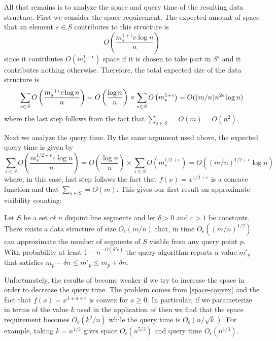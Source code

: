 \documentclass{patmorin}
\newcommand{\Oe}{O_\epsilon}
\begin{document}
All that remains is to analyze the space and query time of the resulting
data structure.  First we consider the space requirement.  The expected
amount of space that an element $s\in S$ contributes to this structure is
\[
    O\left(\frac{m_s^{1+\epsilon}c\log n}{n}\right)
\]
since it contributes $O(m_s^{1+\epsilon})$ space if it is chosen to take
part in $S'$ and it contributes nothing otherwise.  Therefore, the total
expected size of the data structure is
\begin{equation}
    \sum_{s\in S}O\left(\frac{m_s^{1+\epsilon}c\log n}{n}\right)
     = O\left(\frac{\log n}{n}\right)
         \times\sum_{s\in S}O\left(m_s^{1+\epsilon}\right)
     = O((m/n)n^{2\epsilon}\log n) \eqlabel{space-convex}
\end{equation}
where the last step follows from the fact that $\sum_{s\in S} = O(m) = O(n^2)$.

Next we analyze the query time. By the same argument used above, the
expected query time is given by 
\[
    \sum_{s\in S}O\left(\frac{m_s^{1/2+\epsilon}c\log n}{n}\right)
     = O\left(\frac{\log n}{n}\right)
         \times\sum_{s\in S}O\left(m_s^{1/2+\epsilon}\right)
     = O((m/n)^{1/2+\epsilon}\log n)
\]
where, in this case, last step follows the fact that
$f(x)=x^{1/2+\epsilon}$ is a concave function and that $\sum_{s\in S}
= O(m)$.  This gives our first result on approximate visibility counting:

\begin{thm}
Let $S$ be a set of $n$ disjoint line segments and let $\delta > 0$ and $c>
1$ be constants.  There exists a
data structure of size $\Oe(m/n)$ that, in time $\Oe((m/n)^{1/2})$
can approximate the number of segments of $S$ visible from any query
point $p$.  With probability at least $1-n^{-\Omega(\delta^2 c)}$ the
query algorithm reports a value $m'_p$ that satisfies $m_p-\delta n \le
m'_p \le m_p+\delta n$.
\end{thm}

Unfortunately, the results of  become weaker if we try
to increase the space in order to decrease the query time.  The problem
comes from \eqref{space-convex} and the fact that $f(x)=x^{1+a+\epsilon}$
is convex for $a\ge 0$.  In particular, if we parameterize in terms of
the value $k$ used in the application of  then we
find that the space requirement becomes $\Oe(k^2/n)$ while the query
time is $\Oe(n/\sqrt{k})$.  For example, taking $k=n^{4/3}$ gives space
$\Oe(n^{5/3})$ and query time $\Oe(n^{1/3})$.
\end{document}
